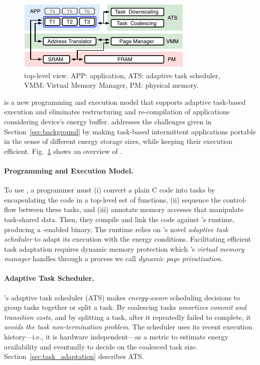 \begin{figure}
	\centering
	\includegraphics[width=\columnwidth]{figures/system-overview.pdf}
	\caption{\sys top-level view. APP: application, ATS: adaptive task scheduler, VMM: Virtual Memory Manager, PM: physical memory.}
	\label{fig:system_overview}
\end{figure}

\sys is a new programming and execution model that supports adaptive task-based execution and eliminates restructuring and re-compilation of applications considering device's energy buffer. \sys addresses the challenges given in Section~\ref{sec:background} by making task-based intermittent applications portable in the sense of different energy storage sizes, while keeping their execution efficient. Fig.~\ref{fig:system_overview} shows an overview of \sys.

\paragraph{Programming and Execution Model.}
To use \sys, a programmer must (i) convert a plain C code into tasks by encapsulating the code in a top-level set of functions, (ii) sequence the control-flow between these tasks, and (iii) annotate memory accesses that manipulate task-shared data. Then, they compile and link the code against \sys's runtime, producing a \sys-enabled binary. The runtime relies on \sys's novel {\em adaptive task scheduler} to adapt its execution with the energy conditions. Facilitating efficient task adaptation requires dynamic memory protection which \sys's \emph{virtual memory manager} handles through a process we call \emph{dynamic page privatization}.

\paragraph{Adaptive Task Scheduler.}
\sys's adaptive task scheduler (ATS) makes \emph{energy-aware} scheduling decisions to group tasks together or split a task. By coalescing tasks \sys \emph{amortizes commit and transition costs}, and by splitting a task, after it repeatedly failed to complete, it \emph{avoids the task non-termination problem}. The scheduler uses its recent execution history---i.e., it is hardware independent---as a metric to estimate energy availability and eventually to decide on the coalesced task size. Section~\ref{sec:task_adaptation} describes ATS.


